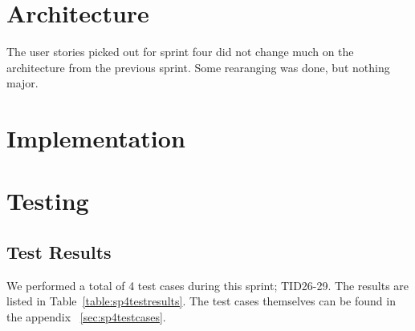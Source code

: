 \section{Architecture}
The user stories picked out for sprint four did not change much on the architecture from the previous sprint. Some rearanging was done, but nothing major.

\section{Implementation}

\section{Testing}
\subsection{Test Results}
We performed a total of 4 test cases during this sprint; TID26-29. The results are listed in Table~\ref{table:sp4testresults}. The test cases themselves can be found in the appendix ~\ref{sec:sp4testcases}.

